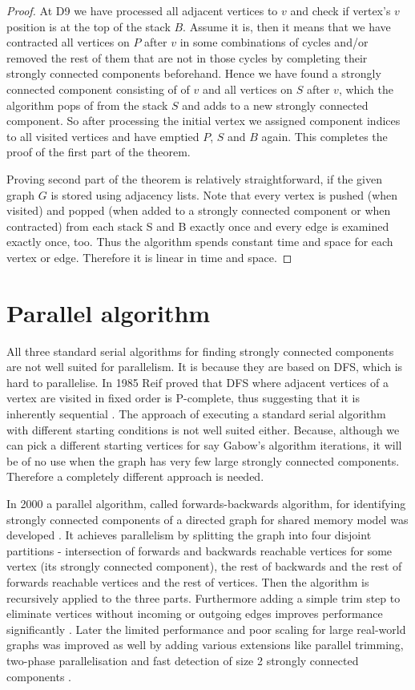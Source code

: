 \documentclass{report}
\theoremstyle{plain}
\theoremstyle{definition}
\theoremstyle{remark}
\numberwithin{definition}{chapter}
\numberwithin{example}{chapter}
\numberwithin{figure}{chapter}
\numberwithin{theorem}{chapter}
\numberwithin{lemma}{chapter}
\begin{document}
\begin{proof}
At D9 we have processed all adjacent vertices to $v$ and check if vertex's $v$ position is at the top of the stack $B$. Assume it is, then it means that we have contracted all vertices on $P$ after $v$ in some combinations of cycles and/or removed the rest of them that are not in those cycles by completing their strongly connected components beforehand. Hence we have found a strongly connected component consisting of of $v$ and all vertices on $S$ after $v$, which the algorithm pops of from the stack $S$ and adds to a new strongly connected component. So after processing the initial vertex we assigned component indices to all visited vertices and have emptied $P$, $S$ and $B$ again. This completes the proof  of the first part of the theorem.

Proving second part of the theorem is relatively straightforward, if the given graph $G$ is stored using adjacency lists. Note that every vertex is pushed (when visited) and popped (when added to a strongly connected component or when contracted) from each stack S and B exactly once and every edge is examined exactly once, too. Thus the algorithm spends constant time and space for each vertex or edge. Therefore it is linear in time and space.
\end{proof}

\section{Parallel algorithm}

All three standard serial algorithms for finding strongly connected components are not well suited for parallelism. It is because they are based on DFS, which is hard to parallelise. In 1985 Reif proved that DFS where adjacent vertices of a vertex are visited in fixed order is P-complete, thus suggesting that it is inherently sequential \cite{reif1985depth}. The approach of executing a standard serial algorithm with different starting conditions is not well suited either. Because, although we can pick a different starting vertices for say Gabow's algorithm iterations, it will be of no use when the graph has very few large strongly connected components. Therefore a completely different approach is needed.

In 2000 a parallel algorithm, called forwards-backwards algorithm, for identifying strongly connected components of a directed graph for shared memory model was developed \cite{fleischer2000identifying}. It achieves parallelism by splitting the graph into four disjoint partitions - intersection of forwards and backwards reachable vertices for some vertex (its strongly connected component), the rest of backwards and the rest of forwards reachable vertices and the rest of vertices. Then the algorithm is recursively applied to the three parts. Furthermore adding a simple trim step to eliminate vertices without incoming or outgoing edges improves performance significantly \cite{mclendon2005finding}. Later the limited performance and poor scaling for large real-world graphs was improved as well by adding various extensions like parallel trimming, two-phase parallelisation and fast detection of size 2 strongly connected components \cite{hongtechnical}.
\end{document}
